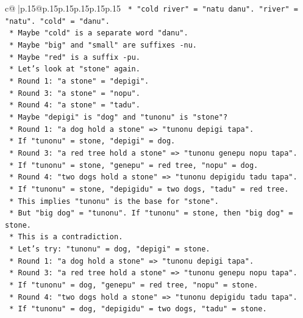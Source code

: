 \documentclass{article}
\begin{document}
{\begin{supertabular}{c@{$\;$}|p{.15\linewidth}@{}p{.15\linewidth}p{.15\linewidth}p{.15\linewidth}p{.15\linewidth}p{.15\linewidth}}
{{{\texttt{        *   "cold river" = "natu danu". "river" = "natu". "cold" = "danu".} \\
\texttt{        *   Maybe "cold" is a separate word "danu".} \\
\texttt{        *   Maybe "big" and "small" are suffixes {-}nu.} \\
\texttt{        *   Maybe "red" is a suffix {-}pu.} \\
\texttt{        *   Let's look at "stone" again.} \\
\texttt{        *   Round 1: "a stone" = "depigi".} \\
\texttt{        *   Round 3: "a stone" = "nopu".} \\
\texttt{        *   Round 4: "a stone" = "tadu".} \\
\texttt{        *   Maybe "depigi" is "dog" and "tunonu" is "stone"?} \\
\texttt{        *   Round 1: "a dog hold a stone" => "tunonu depigi tapa".} \\
\texttt{        *   If "tunonu" = stone, "depigi" = dog.} \\
\texttt{        *   Round 3: "a red tree hold a stone" => "tunonu genepu nopu tapa".} \\
\texttt{        *   If "tunonu" = stone, "genepu" = red tree, "nopu" = dog.} \\
\texttt{        *   Round 4: "two dogs hold a stone" => "tunonu depigidu tadu tapa".} \\
\texttt{        *   If "tunonu" = stone, "depigidu" = two dogs, "tadu" = red tree.} \\
\texttt{        *   This implies "tunonu" is the base for "stone".} \\
\texttt{        *   But "big dog" = "tunonu". If "tunonu" = stone, then "big dog" = stone.} \\
\texttt{        *   This is a contradiction.} \\
\texttt{        *   Let's try: "tunonu" = dog, "depigi" = stone.} \\
\texttt{        *   Round 1: "a dog hold a stone" => "tunonu depigi tapa".} \\
\texttt{        *   Round 3: "a red tree hold a stone" => "tunonu genepu nopu tapa".} \\
\texttt{        *   If "tunonu" = dog, "genepu" = red tree, "nopu" = stone.} \\
\texttt{        *   Round 4: "two dogs hold a stone" => "tunonu depigidu tadu tapa".} \\
\texttt{        *   If "tunonu" = dog, "depigidu" = two dogs, "tadu" = stone.} \\
}}}
\end{supertabular}}
\end{document}
